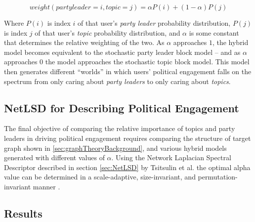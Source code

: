 \begin{equation}
    weight(party leader=i, topic=j)=\alpha P(i)+(1-\alpha)P(j)
\end{equation}

Where $P(i)$ is index $i$ of that user's \emph{party leader} probability
distribution, $P(j)$ is index $j$ of that user's \emph{topic} probability
distribution, and $\alpha$ is some constant that determines the relative
weighting of the two. As $\alpha$ approaches $1$, the hybrid model becomes
equivalent to the stochastic party leader block model -- and as $\alpha$
approaches $0$ the model approaches the stochastic topic block model. This model
then generates different ``worlds'' in which users' political engagement falls on
the spectrum from only caring about \emph{party leaders} to only caring about
\emph{topics}.

\subsection{NetLSD for Describing Political Engagement}\label{sec:NetLSDForSBM}

The final objective of comparing the relative importance of topics and party
leaders in driving political engagement requires comparing the structure of
target graph shown in \ref{sec:graphTheoryBackground}, and various hybrid models
generated with different values of $\alpha$. Using the Network Laplacian
Spectral Descriptor described in section \ref{sec:NetLSD} by Tsitsulin et al.
the optimal alpha value can be determined in a scale-adaptive, size-invariant,
and permutation-invariant manner \cite{netlsd}.

\subsection{Results}\label{sec:SBMsResults}

